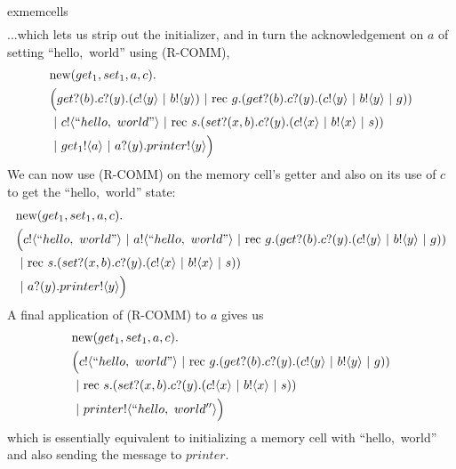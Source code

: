 \begin{example}{exmemcells}
\begin{equation}
\begin{split}
	\end{split}\end{equation}
	...which lets us strip out the initializer, and in turn the acknowledgement on $a$ of setting ``hello,\ world'' using (R-COMM),
	\begin{equation}\begin{split}
		&\text{new}({get_1,set_1,a,c}).\\
		&\Big({get}?({b}).{c}?({y}).({c}!\langle{y}\rangle\ |\  {b}!\langle{y}\rangle)\ |\  \text{rec }{g}.({get}?({b}).{c}?({y}).({c}!\langle{y}\rangle\ |\  {b}!\langle{y}\rangle\ |\  g))\\
			&\ |\  {c}!\langle{``hello,\ world"}\rangle \ |\  \text{rec }{s}.({set}?({x,b}).{c}?({y}).({c}!\langle{x}\rangle\ |\ {b}!\langle{x}\rangle\ |\  s))\\
		&\ |\  {get_1}!\langle{a}\rangle\ |\  {a}?({y}).{printer}!\langle{y}\rangle\Big)
	\end{split}\end{equation}
	We can now use (R-COMM) on the memory cell's getter and also on its use of $c$ to get the ``hello,\ world'' state:
	\begin{equation}\begin{split}
		&\new{get_1,set_1,a,c}\\
		&\Big(\send{c}{``hello,\ world"}\comp \send{a}{``hello,\ world"}\comp \rec{g}(\receive{get}{b}\receive{c}{y}(\send{c}{y}\comp \send{b}{y}\comp g))\\
			&\comp \rec{s}(\receive{set}{x,b}\receive{c}{y}(\send{c}{x}\comp\send{b}{x}\comp s))\\
		&\comp \receive{a}{y}\send{printer}{y}\Big)
	\end{split}\end{equation}
	A final application of (R-COMM) to $a$ gives us
	\begin{equation}\begin{split}
		&\text{new}({get_1,set_1,a,c}).\\
		&\Big({c}!\langle{``hello,\ world"}\rangle\ |\  \text{rec }{g}.({get}?({b}).{c}?({y}).({c}!\langle{y}\rangle\ |\  {b}!\langle{y}\rangle\ |\  g))\\
			&\ |\  \text{rec }{s}.({set}?({x,b}).{c}?({y}).({c}!\langle{x}\rangle\ |\ {b}!\langle{x}\rangle\ |\  s))\\
		&\ |\  {printer}!\langle{``hello,\ world''}\rangle\Big)
	\end{split}\end{equation}
	which is essentially equivalent to initializing a memory cell with ``hello,\ world'' and also sending the message to $printer$.
\end{example}


